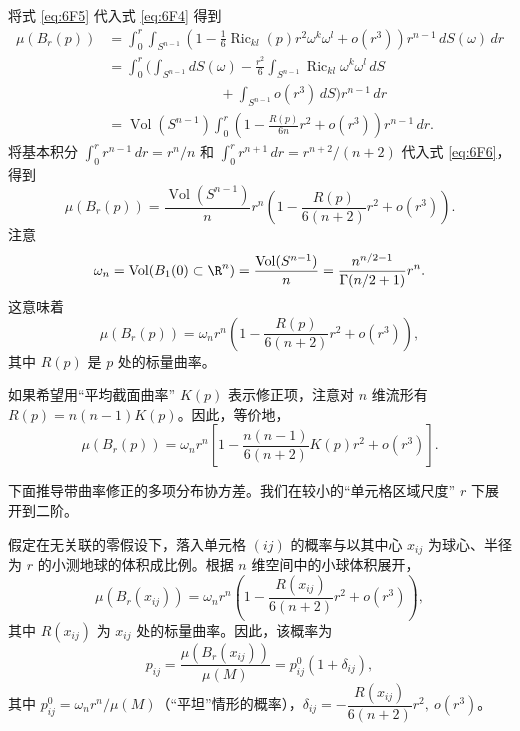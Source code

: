 将式 \eqref{eq:6F5} 代入式 \eqref{eq:6F4} 得到
\begin{equation*}
  \begin{aligned}
    \mu(B_r(p))&=\int_0^r\int_{S^{n-1}}
        \left(1-\tfrac16\operatorname{Ric}_{kl}(p)r^2\omega^k\omega^l+o(r^3)\right)
        r^{n-1}\,dS(\omega)\,dr\\
    &=\int_0^r\biggl(\int_{S^{n-1}}dS(\omega)
        -\frac{r^2}{6}\int_{S^{n-1}}\operatorname{Ric}_{kl}\omega^k\omega^l\,dS\\
    &\hspace{8em}+\int_{S^{n-1}}o(r^3)\,dS\biggr)r^{n-1}\,dr\\
    &=\operatorname{Vol}(S^{n-1})\int_0^r
        \left(1-\frac{R(p)}{6n}r^2+o(r^3)\right)r^{n-1}\,dr.
  \end{aligned}
  \tag{6F6}\label{eq:6F6}
\end{equation*}
将基本积分 $\int_0^r r^{n-1}\,dr=r^n/n$ 和 $\int_0^r r^{n+1}\,dr=r^{n+2}/(n+2)$ 代入式 \eqref{eq:6F6}，得到
\[
  \mu(B_r(p))=\frac{\operatorname{Vol}(S^{n-1})}{n}r^n
        \left(1-\frac{R(p)}{6(n+2)}r^2+o(r^3)\right).
\]
注意
\[
  \omega_n=\operatorname{Vol}(B_1(0)\subset\R^n)
       =\frac{\operatorname{Vol}(S^{n-1})}{n}
       =\frac{n^{n/2-1}}{\Gamma(n/2+1)}r^n.
\]
这意味着
\[
  \mu(B_r(p))=\omega_n r^n\left(1-\frac{R(p)}{6(n+2)}r^2+o(r^3)\right),
\]
其中 $R(p)$ 是 $p$ 处的标量曲率。

如果希望用“平均截面曲率” $K(p)$ 表示修正项，注意对 $n$ 维流形有 $R(p)=n(n-1)K(p)$。因此，等价地，
\[
  \mu(B_r(p))=\omega_n r^n
     \left[1-\frac{n(n-1)}{6(n+2)}K(p)r^2+o(r^3)\right].
\]


下面推导带曲率修正的多项分布协方差。我们在较小的“单元格区域尺度” $r$ 下展开到二阶。


假定在无关联的零假设下，落入单元格 $(ij)$ 的概率与以其中心 $x_{ij}$ 为球心、半径为 $r$ 的小测地球的体积成比例。根据 $n$ 维空间中的小球体积展开，
\[
  \mu(B_r(x_{ij}))=\omega_n r^n
      \left(1-\frac{R(x_{ij})}{6(n+2)}r^2+o(r^3)\right),
\]
其中 $R(x_{ij})$ 为 $x_{ij}$ 处的标量曲率。因此，该概率为
\begin{equation*}
  p_{ij}=\frac{\mu(B_r(x_{ij}))}{\mu(M)}=p_{ij}^0(1+\delta_{ij}),
  \tag{6G1}\label{eq:6G1}
\end{equation*}
其中 $p_{ij}^0=\omega_n r^n/\mu(M)$（“平坦”情形的概率），$\delta_{ij}=-\dfrac{R(x_{ij})}{6(n+2)}r^2,\ o(r^3)$。

